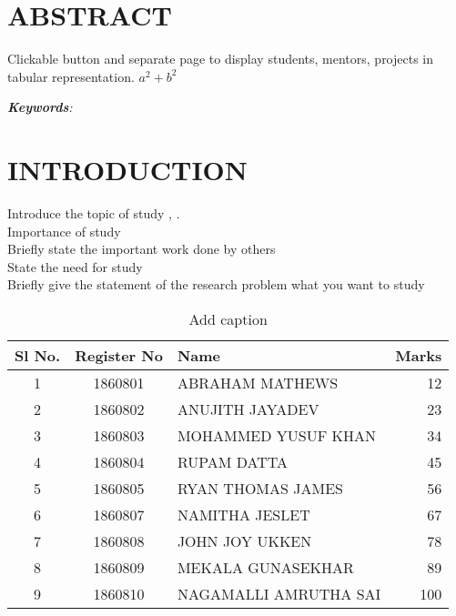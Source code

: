 \pagebreak
\section*{ABSTRACT}

Clickable button and separate page to display students, mentors, projects in tabular representation.
${a^2} + {b^2}$


	
\textit{\textbf{Keywords}:}

\section{INTRODUCTION}




Introduce the topic of study \cite{Jain2019}, \cite{Chmiel2019}.\\
Importance of study\\
Briefly state the important work done by others\\
State the need for study\\
Briefly give the statement of the research problem what you want to study\\


\begin{table}[htbp]
	\centering
	\caption{Add caption}
	\begin{tabular}{|c|c|l|r|}
		\toprule
		\rowcolor[rgb]{ .749,  .749,  .749} \textbf{Sl No.} & \textbf{Register No} & \textbf{Name} & \multicolumn{1}{c|}{\textbf{Marks}} \\
		\midrule
		1     & 1860801 & ABRAHAM MATHEWS & 12 \\
		\midrule
		2     & 1860802 & ANUJITH JAYADEV & 23 \\
		\midrule
		3     & 1860803 & MOHAMMED YUSUF KHAN & 34 \\
		\midrule
		4     & 1860804 & RUPAM DATTA & 45 \\
		\midrule
		5     & 1860805 & RYAN THOMAS JAMES & 56 \\
		\midrule
		6     & 1860807 & NAMITHA JESLET & 67 \\
		\midrule
		7     & 1860808 & JOHN JOY UKKEN & 78 \\
		\midrule
		8     & 1860809 & MEKALA GUNASEKHAR & 89 \\
		\midrule
		9     & 1860810 & NAGAMALLI AMRUTHA SAI & 100 \\
		\bottomrule
	\end{tabular}%
	\label{tab:addlabel}%
\end{table}%


